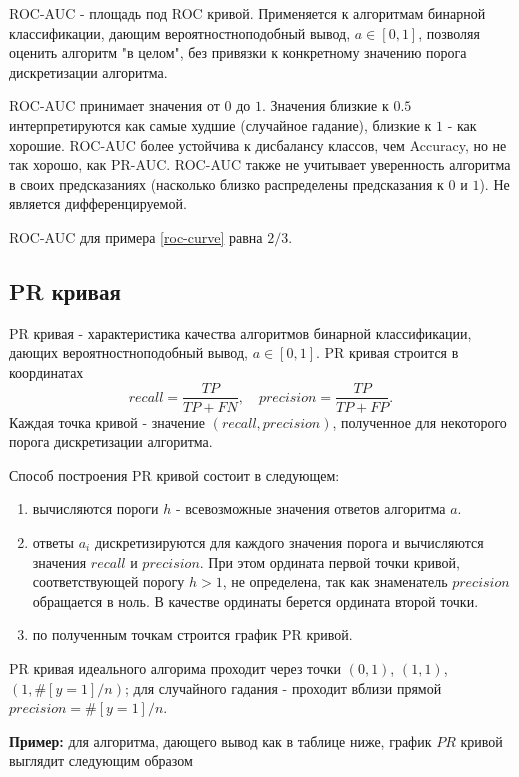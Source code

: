 ROC-AUC - площадь под ROC кривой. Применяется к алгоритмам бинарной классификации, дающим вероятностноподобный вывод, $a\in[0, 1]$, позволяя оценить алгоритм "в целом", без привязки к конкретному значению порога дискретизации алгоритма.

ROC-AUC принимает значения от $0$ до $1$. Значения близкие к $0.5$ интерпретируются как самые худшие (случайное гадание), близкие к $1$ - как хорошие. ROC-AUC более устойчива к дисбалансу классов, чем Accuracy, но не так хорошо, как PR-AUC. ROC-AUC также не учитывает уверенность алгоритма в своих предсказаниях (насколько близко распределены предсказания к $0$ и $1$). Не является дифференцируемой.

ROC-AUC для примера \ref{roc-curve} равна $2/3$.

\subsection{PR кривая}\label{pr-curve}

PR кривая - характеристика качества алгоритмов бинарной классификации, дающих вероятностноподобный вывод, $a\in[0, 1]$. 
PR кривая строится в координатах 
$$
recall = \frac{TP}{TP + FN}, \quad precision = \frac{TP}{TP + FP}.
$$
Каждая точка кривой - значение $(recall, precision)$, полученное для некоторого порога дискретизации алгоритма. 

Способ построения PR кривой состоит в следующем:
\begin{enumerate}
    \item вычисляются пороги $h$ - всевозможные значения ответов алгоритма $a$.
    \item ответы $a_i$ дискретизируются для каждого значения порога и вычисляются значения $recall$ и $precision$. При этом ордината первой точки кривой, соответствующей порогу $h>1$, не определена, так как знаменатель $precision$ обращается в ноль. В качестве ординаты берется ордината второй точки.
    \item по полученным точкам строится график PR кривой. 
\end{enumerate}

PR кривая идеального алгорима проходит через точки $(0,1)$, $(1,1)$, $(1,\#[y=1]/n)$; для случайного гадания - проходит вблизи прямой $precision = \#[y=1]/n$.

\textbf{Пример:} для алгоритма, дающего вывод как в таблице ниже, график $PR$ кривой выглядит следующим образом


